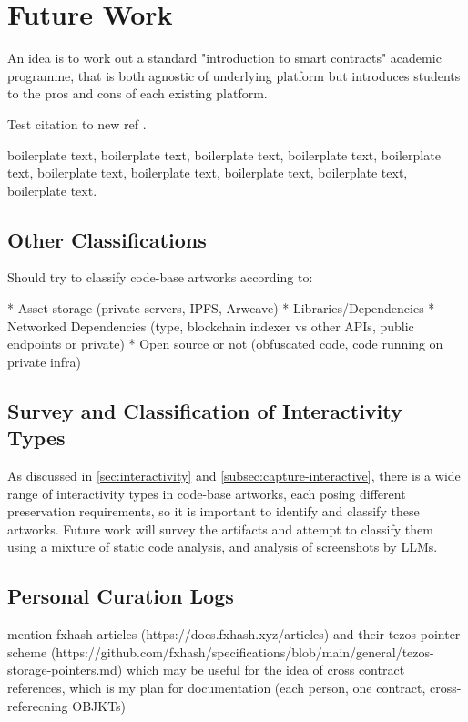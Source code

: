\section{Future Work}


An idea is to work out a standard "introduction to smart contracts" academic programme, that is both agnostic of underlying platform but introduces students to the pros and cons of each existing platform.

Test citation to new ref  \cite{dekkerCollectingConservingNet2018}.

boilerplate text, boilerplate text, boilerplate text, boilerplate text, boilerplate text, boilerplate text, boilerplate text, boilerplate text, boilerplate text, boilerplate text.


\subsection{Other Classifications}

Should try to classify code-base artworks according to:

* Asset storage (private servers, IPFS, Arweave)
* Libraries/Dependencies
* Networked Dependencies (type, blockchain indexer vs other APIs, public endpoints or private)
* Open source or not (obfuscated code, code running on private infra)



\subsection{Survey and Classification of Interactivity Types}

As discussed in \autoref{sec:interactivity} and \autoref{subsec:capture-interactive}, there is a wide range of interactivity types in code-base artworks, each posing different preservation requirements, so it is important to identify and classify these artworks. Future work will survey the artifacts and attempt to classify them using a mixture of static code analysis, and analysis of screenshots by LLMs.


\subsection{Personal Curation Logs}

mention fxhash articles (https://docs.fxhash.xyz/articles) and their tezos pointer scheme (https://github.com/fxhash/specifications/blob/main/general/tezos-storage-pointers.md) which may be useful for the idea of cross contract references, which is my plan for documentation (each person, one contract, cross-referecning OBJKTs)

